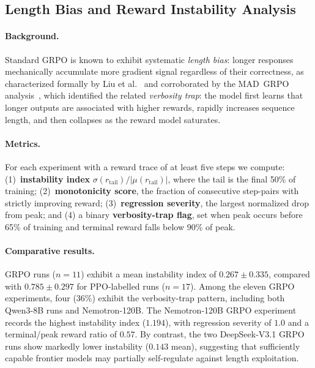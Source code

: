 \documentclass{article}
\begin{document}
\subsection{Length Bias and Reward Instability Analysis}
\label{sec:length_bias}

\paragraph{Background.}
Standard GRPO is known to exhibit systematic \emph{length bias}: longer responses
mechanically accumulate more gradient signal regardless of their correctness,
as characterized formally by Liu et al.~\cite{tong2025drgrpo} and corroborated
by the MAD~GRPO analysis~\cite{taghia2026madgrpo}, which identified the related
\emph{verbosity trap}: the model first learns that longer outputs are associated
with higher rewards, rapidly increases sequence length, and then collapses as
the reward model saturates.

\paragraph{Metrics.}
For each experiment with a reward trace of at least five steps we compute:
(1)~\textbf{instability index} $\sigma(r_{\text{tail}}) / |\mu(r_{\text{tail}})|$,
where the tail is the final 50\% of training;
(2)~\textbf{monotonicity score}, the fraction of consecutive step-pairs with
strictly improving reward;
(3)~\textbf{regression severity}, the largest normalized drop from peak;
and (4) a binary \textbf{verbosity-trap flag}, set when peak occurs before 65\%
of training and terminal reward falls below 90\% of peak.

\paragraph{Comparative results.}
GRPO runs ($n = 11$) exhibit a mean instability index of $0.267 \pm 0.335$,
compared with $0.785 \pm 0.297$ for PPO-labelled runs ($n = 17$). Among the
eleven GRPO experiments, four (36\%) exhibit the verbosity-trap pattern,
including both Qwen3-8B runs and Nemotron-120B. The Nemotron-120B GRPO
experiment records the highest instability index ($1.194$), with regression
severity of $1.0$ and a terminal/peak reward ratio of $0.57$. By contrast,
the two DeepSeek-V3.1 GRPO runs show markedly lower instability ($0.143$
mean), suggesting that sufficiently capable frontier models may partially
self-regulate against length exploitation.
\end{document}
